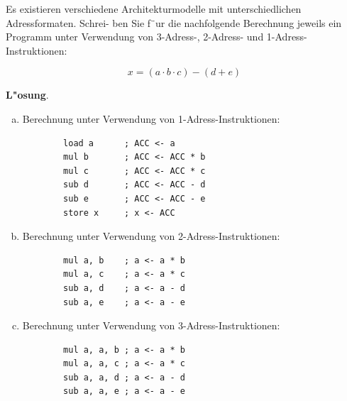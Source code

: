 \documentclass[10pt, a4paper, oneside]{article}
\begin{document}
Es existieren verschiedene Architekturmodelle mit unterschiedlichen
Adressformaten. Schrei- ben Sie f¨ur die nachfolgende Berechnung jeweils ein
Programm unter Verwendung von 3-Adress-, 2-Adress- und 1-Adress-Instruktionen:

\begin{equation*}
    x = (a \cdot b \cdot c) - (d + e)
\end{equation*}

\textbf{L"osung}.

\begin{enumerate}[(a)]
    \item Berechnung unter Verwendung von 1-Adress-Instruktionen:
        \begin{verbatim}
        load a      ; ACC <- a
        mul b       ; ACC <- ACC * b
        mul c       ; ACC <- ACC * c
        sub d       ; ACC <- ACC - d
        sub e       ; ACC <- ACC - e
        store x     ; x <- ACC
        \end{verbatim}
    \item Berechnung unter Verwendung von 2-Adress-Instruktionen:
        \begin{verbatim}
        mul a, b    ; a <- a * b
        mul a, c    ; a <- a * c
        sub a, d    ; a <- a - d
        sub a, e    ; a <- a - e
        \end{verbatim}
    \item Berechnung unter Verwendung von 3-Adress-Instruktionen:
        \begin{verbatim}
        mul a, a, b ; a <- a * b
        mul a, a, c ; a <- a * c
        sub a, a, d ; a <- a - d
        sub a, a, e ; a <- a - e
        \end{verbatim}
\end{enumerate}
\end{document}
